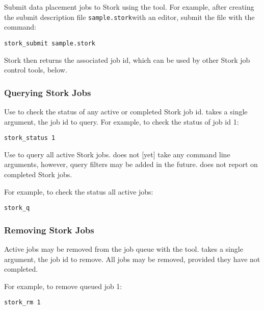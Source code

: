 Submit data placement jobs to Stork using the  tool.  For
example, after creating the submit description file \texttt{sample.stork}with an
editor, submit the file with the command:

\begin{verbatim}
stork_submit sample.stork
\end{verbatim}

Stork then returns the associated job id, which can be used by other Stork
job control tools, below.

\subsubsection{\label{sec:stork-query}Querying Stork Jobs}

Use  to check the status of any active or completed Stork
job id.   takes a single argument, the job id to query.
For example, to check the status of job id 1:

\begin{verbatim}
stork_status 1
\end{verbatim}

Use  to query all active Stork jobs.  
 does not [yet] take any command line arguments, however, query
filters may be added in the future.  
 does not report on completed Stork jobs.

For example, to check the status all active jobs:

\begin{verbatim}
stork_q
\end{verbatim}

\subsubsection{\label{sec:stork-rm}Removing Stork Jobs}

Active jobs may be removed from the job queue with the 
 tool.  
 takes a single argument, the job id to remove.  All jobs may
be removed, provided they have not completed.

For example, to remove queued job 1:

\begin{verbatim}
stork_rm 1
\end{verbatim}

